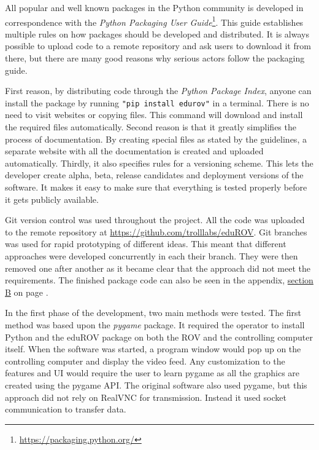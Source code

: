 All popular and well known packages in the Python community is developed in correspondence with the \emph{Python Packaging User Guide}\footnote{\url{https://packaging.python.org/}}. This guide establishes multiple rules on how packages should be developed and distributed. It is always possible to upload code to a remote repository and ask users to download it from there, but there are many good reasons why serious actors follow the packaging guide. 

First reason, by distributing code through the \emph{Python Package Index}, anyone can install the package by running \texttt{"pip install edurov"} in a terminal. There is no need to visit websites or copying files. This command will download and install the required files automatically. 
Second reason is that it greatly simplifies the process of documentation. By creating special files as stated by the guidelines, a separate website with all the documentation is created and uploaded automatically. Thirdly, it also specifies rules for a versioning scheme. This lets the developer create alpha, beta, release candidates and deployment versions of the software. It makes it easy to make sure that everything is tested properly before it gets publicly available.

Git version control was used throughout the project. All the code was uploaded to the remote repository at \url{https://github.com/trolllabs/eduROV}. Git branches was used for rapid prototyping of different ideas. This meant that different approaches were developed concurrently in each their branch. They were then removed one after another as it became clear that the approach did not meet the requirements. The finished package code can also be seen in the appendix, \hyperref[appCode]{section B} on page \pageref{appCode}.

\vspace{-2mm}
In the first phase of the development, two main methods were tested. The first method was based upon the \emph{pygame} package. It required the operator to install Python and the eduROV package on both the ROV and the controlling computer itself. When the software was started, a program window would pop up on the controlling computer and display the video feed. Any customization to the features and UI would require the user to learn pygame as all the graphics are created using the pygame API. The original software also used pygame, but this approach did not rely on RealVNC for transmission. Instead it used socket communication to transfer data.

